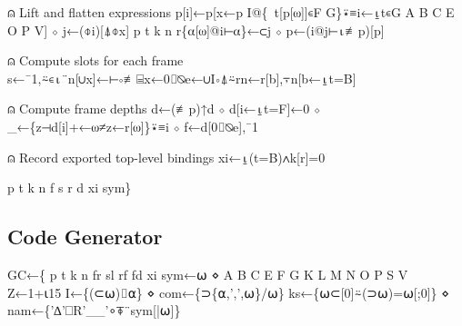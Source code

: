 \documentclass{article}%
\begin{document}
⍝ Lift and flatten expressions
         p[i]←p[x←p I@\{~t[p[⍵]]∊F G\}⍣≡i←⍸t∊G A B C E O P V] ⋄ j←(⌽i)[⍋⌽x]
         p t k n r\{⍺[⍵]@i⊢⍺\}←⊂j ⋄ p←(i@j⊢⍳≢p)[p]

⍝ Compute slots for each frame
         s←¯1,⍨∊⍳¨n[∪x]←⊢∘≢⌸x←0⌷⍉e←∪I∘⍋⍨rn←r[b],⍪n[b←⍸t=B]

⍝ Compute frame depths
         d←(≢p)↑d ⋄ d[i←⍸t=F]←0 ⋄ _←\{z⊣d[i]+←⍵≠z←r[⍵]\}⍣≡i ⋄ f←d[0⌷⍉e],¯1

⍝ Record exported top-level bindings
         xi←⍸(t=B)∧k[r]=0

         p t k n f s r d xi sym\}
\nwendcode{}\nwdocspar

\subsection{Code Generator}

\nwenddocs{}\endmoddef\nwstartdeflinemarkup{}\nwenddeflinemarkup
GC←\{
        p t k n fr sl rf fd xi sym←⍵ ⋄ A B C E F G K L M N O P S V Z←1+⍳15
        I←\{(⊂⍵)⌷⍺\} ⋄ com←\{⊃\{⍺,',',⍵\}/⍵\}
        ks←\{⍵⊂[0]⍨(⊃⍵)=⍵[;0]\} ⋄ nam←\{'∆'⎕R'__'∘⍕¨sym[|⍵]\}
\end{document}

